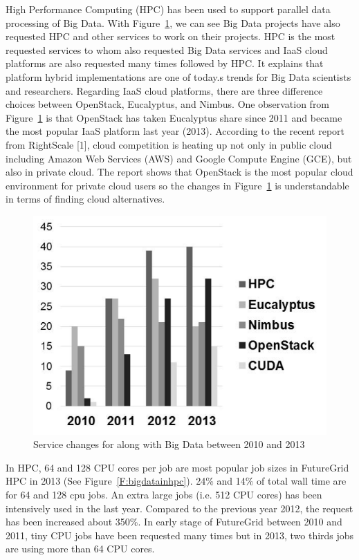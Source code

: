 \documentclass{sig-alternate}
\begin{document}
High Performance Computing (HPC) has been used to support parallel data processing of Big Data. With Figure~\ref{F:bigdata}, we can see Big Data projects have also requested HPC and other services to work on their projects. HPC is the most requested services to whom also requested Big Data services and IaaS cloud platforms are also requested many times followed by HPC. It explains that platform hybrid implementations are one of today.s trends for Big Data scientists and researchers. Regarding IaaS cloud platforms, there are three difference choices between OpenStack, Eucalyptus, and Nimbus. One observation from Figure~\ref{F:bigdata} is that OpenStack has taken Eucalyptus share since 2011 and became the most popular IaaS platform last year (2013). According to the recent report from RightScale [1], cloud competition is heating up not only in public cloud including Amazon Web Services (AWS) and Google Compute Engine (GCE), but also in private cloud. The report shows that OpenStack is the most popular cloud environment for private cloud users so the changes in Figure~\ref{F:bigdata} is understandable in terms of finding cloud alternatives.

\begin{figure}[h!]
  \centering
    \includegraphics[width=1.0\columnwidth]{images/bigdata.pdf} 
  \caption{Service changes for along with Big Data between 2010 and 2013}\label{F:bigdata} 
\end{figure} 

In HPC, 64 and 128 CPU cores per job are most popular job sizes in FutureGrid HPC in 2013 (See Figure~\ref{F:bigdatainhpc}). 24\% and 14\% of total wall time are for 64 and 128 cpu jobs. An extra large jobs (i.e. 512 CPU cores) has been intensively used in the last year. Compared to the previous year 2012, the request has been increased about 350\%. In early stage of FutureGrid between 2010 and 2011, tiny CPU jobs have been requested many times but in 2013, two thirds jobs are using more than 64 CPU cores.
\end{document}
